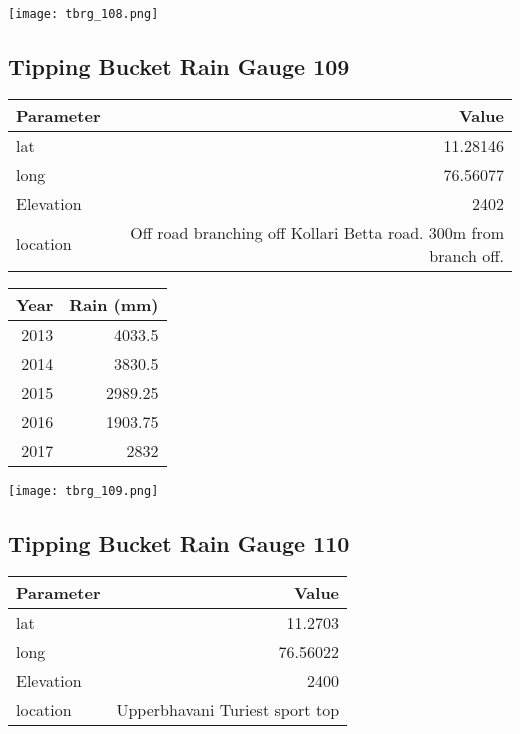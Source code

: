 \documentclass[a4paper]{article}
\begin{document}
\begin{center}
\texttt{[image: tbrg\_108.png]}
\end{center}


\newpage

\subsection*{Tipping Bucket Rain Gauge 109}
\label{sec:orgb5d6076}

\begin{center}
\begin{tabular}{lr}
Parameter & Value\\
\hline
lat & 11.28146\\
long & 76.56077\\
Elevation & 2402\\
location & Off road branching off Kollari Betta road. 300m from branch off.\\
\end{tabular}
\end{center}

\begin{center}
\begin{tabular}{rr}
Year & Rain (mm)\\
\hline
2013 & 4033.5\\
2014 & 3830.5\\
2015 & 2989.25\\
2016 & 1903.75\\
2017 & 2832\\
\end{tabular}
\end{center}

\begin{center}
\texttt{[image: tbrg\_109.png]}
\end{center}


\newpage

\subsection*{Tipping Bucket Rain Gauge 110}
\label{sec:org21ffe9b}

\begin{center}
\begin{tabular}{lr}
Parameter & Value\\
\hline
lat & 11.2703\\
long & 76.56022\\
Elevation & 2400\\
location & Upperbhavani Turiest sport top\\
\end{tabular}
\end{center}
\end{document}
